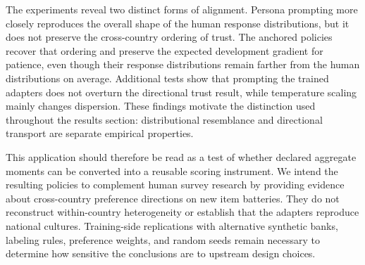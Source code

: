 The experiments reveal two distinct forms of alignment. Persona prompting more closely reproduces the overall shape of the human response distributions, but it does not preserve the cross-country ordering of trust. The anchored policies recover that ordering and preserve the expected development gradient for patience, even though their response distributions remain farther from the human distributions on average. Additional tests show that prompting the trained adapters does not overturn the directional trust result, while temperature scaling mainly changes dispersion. These findings motivate the distinction used throughout the results section: distributional resemblance and directional transport are separate empirical properties.

This application should therefore be read as a test of whether declared aggregate moments can be converted into a reusable scoring instrument. We intend the resulting policies to complement human survey research by providing evidence about cross-country preference directions on new item batteries. They do not reconstruct within-country heterogeneity or establish that the adapters reproduce national cultures. Training-side replications with alternative synthetic banks, labeling rules, preference weights, and random seeds remain necessary to determine how sensitive the conclusions are to upstream design choices.
